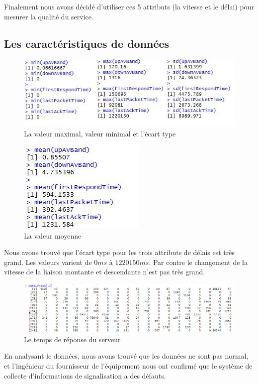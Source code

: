 Finalement nous avons décidé d'utiliser ces 5 attributs (la vitesse et le délai) pour mesurer la qualité du service.

\subsection{Les caractéristiques de données}



\begin{figure}[H]
\centering
\includegraphics[width=0.8\linewidth, height=0.2\textheight]{images/max-min}
\caption{La valeur maximal, valeur minimal et l'écart type}
\label{fig:max-min}
\end{figure}

\begin{figure}[H]
\centering
\includegraphics[width=0.3\linewidth]{images/mean}
\caption{La valeur moyenne}
\label{fig:mean}
\end{figure}

Nous avons trouvé que l'écart type pour les trois attributs de délais est très grand. Les valeurs varient de $0ms$ à $1220150ms$. Par contre le changement  de la vitesse de la liaison montante et descendante n'est pas très grand.

\begin{figure}[H]
\centering
\includegraphics[width=0.9\linewidth]{images/data-delai}
\caption{Le temps de réponse du serveur}
\label{fig:data-delai}
\end{figure}
En analysant le données, nous avons trouvé que les données ne sont pas normal, et l'ingénieur du fournisseur de l'équipement nous ont confirmé que le système de collecte d'informations de signalisation a des défauts. 
 
